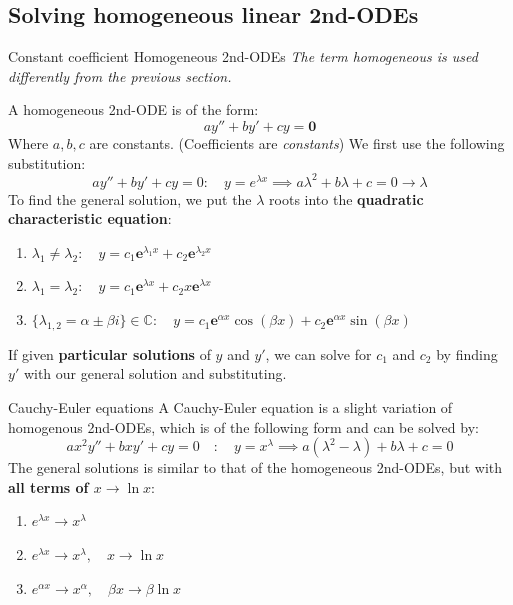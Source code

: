 \documentclass{article}
\begin{document}
\subsection{Solving homogeneous linear 2nd-ODEs}

\label{sec:homogeneous}
\begin{definition}
    {Constant coefficient Homogeneous 2nd-ODEs}
    \emph{The term homogeneous is used differently from the previous section.}

    A homogeneous 2nd-ODE is of the form:
    \[ay''+by'+cy=\mathbf{0}\]
    Where $a,b,c$ are constants. (Coefficients are \emph{constants})
    \tcblower
    We first use the following substitution:
    \[ay''+by'+cy=0:\quad y=e^{\lambda x}\implies a\lambda^2+b\lambda+c=0\to \lambda\]
    To find the general solution, we put the $\lambda$ roots into the \textbf{quadratic characteristic equation}:
    \begin{enumerate}
        \item $\lambda_1\ne\lambda_2:\quad y=c_1\mathbf{e}^{\lambda_1x}+c_2\mathbf{e}^{\lambda_2x}$
        \item $\lambda_1=\lambda_2:\quad y=c_1\mathbf{e}^{\lambda x}+c_2x\mathbf{e}^{\lambda x}$
        \item $\{\lambda_{1,2}=\alpha\pm\beta i\}\in\mathds{C}:\quad y=c_{1}\mathbf{e}^{\alpha x}\cos(\beta x)+c_{2}\mathbf{e}^{\alpha x}\sin(\beta x)$
    \end{enumerate}
    If given \textbf{particular solutions} of $y$ and $y'$, we can solve for $c_1$ and $c_2$ by finding $y'$ with our general solution and substituting.
\end{definition}

\begin{definition}
    {Cauchy-Euler equations}
    A Cauchy-Euler equation is a slight variation of homogenous 2nd-ODEs, which is of the following form and can be solved by:
    \[ax^2y''+bxy'+cy=0\quad:\quad y=x^\lambda\implies a(\lambda^2-\lambda)+b\lambda+c=0\]
    The general solutions is similar to that of the homogeneous 2nd-ODEs, but with \textbf{all terms of $x\to \ln x$}:
    \begin{enumerate}
        \item $e^{\lambda x}\to x^\lambda$
        \item $e^{\lambda x}\to x^\lambda,\quad x\to \ln x$
        \item $e^{\alpha x}\to x^\alpha,\quad \beta x \to \beta \ln x$
    \end{enumerate}
\end{definition}
\end{document}
